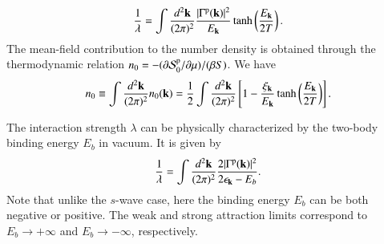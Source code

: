 \documentclass[aps,prd,amsmath,two column,nofootinbib,amssymb,referee]{revtex4}
\begin{document}
\begin{eqnarray}\label{gapp}
{1\over\lambda}=\int {d^2{\bf k}\over(2\pi)^2}{|\Gamma^{\rm p}({\bf k})|^2\over E_{\bf k}}\tanh\left({E_{\bf k}\over2T}\right).
\end{eqnarray}
The mean-field contribution to the number density is obtained through the thermodynamic relation $n_0=-(\partial {\cal S}_0^{\rm p}/\partial\mu)/(\beta S)$. We have
\begin{eqnarray}\label{number0}
n_0\equiv\int{d^2{\bf k}\over(2\pi)^2}n_0({\bf k})={1\over2}\int{d^2{\bf k}\over(2\pi)^2}\left[1-{\xi_{{\bf k}}\over E_{\bf k}}\tanh\left({E_{\bf k}\over2T}\right)\right].
\end{eqnarray}



The interaction strength $\lambda$ can be physically characterized by the two-body binding energy $E_b$ in vacuum. It is given by~\cite{Botelho2005a}
\begin{eqnarray}
{1\over\lambda}=\int{d^2{\bf k}\over(2\pi)^2}{2|\Gamma^{\rm p}({\bf k})|^2\over2\epsilon_{{\bf k}}-E_b}.
\end{eqnarray}
Note that unlike the $s$-wave case, here the binding energy $E_b$ can be both negative or positive. The weak and strong attraction limits correspond to
$E_b\rightarrow+\infty$ and $E_b\rightarrow-\infty$, respectively.
\end{document}
